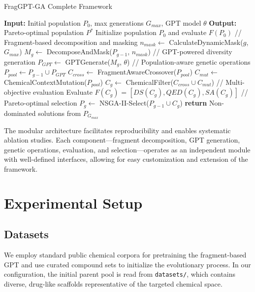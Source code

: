 \documentclass[lettersize,journal]{IEEEtran}
\begin{document}
\begin{algorithm}[!t]
\caption{FragGPT-GA Complete Framework}
\label{alg:frag-gpt-ga}
\begin{algorithmic}
\STATE \textbf{Input:} Initial population $P_0$, max generations $G_{max}$, GPT model $\theta$
\STATE \textbf{Output:} Pareto-optimal population $P^*$
\STATE Initialize population $P_0$ and evaluate $F(P_0)$
    \STATE // Fragment-based decomposition and masking
    \STATE $n_{mask} \leftarrow$ CalculateDynamicMask($g$, $G_{max}$)
    \STATE $M_g \leftarrow$ DecomposeAndMask($P_{g-1}$, $n_{mask}$)
    \STATE // GPT-powered diversity generation
    \STATE $P_{GPT} \leftarrow$ GPTGenerate($M_g$, $\theta$)
    \STATE // Population-aware genetic operations
    \STATE $P_{pool} \leftarrow P_{g-1} \cup P_{GPT}$
    \STATE $C_{cross} \leftarrow$ FragmentAwareCrossover($P_{pool}$)
    \STATE $C_{mut} \leftarrow$ ChemicalContextMutation($P_{pool}$)
    \STATE $C_g \leftarrow$ ChemicalFilter($C_{cross} \cup C_{mut}$)
    \STATE // Multi-objective evaluation
    \STATE Evaluate $F(C_g)$ = $[DS(C_g), QED(C_g), SA(C_g)]$
    \STATE // Pareto-optimal selection
    \STATE $P_g \leftarrow$ NSGA-II-Select($P_{g-1} \cup C_g$)
\ENDFOR
\STATE \textbf{return} Non-dominated solutions from $P_{G_{max}}$
\end{algorithmic}
\end{algorithm}

The modular architecture facilitates reproducibility and enables systematic ablation studies. Each component—fragment decomposition, GPT generation, genetic operations, evaluation, and selection—operates as an independent module with well-defined interfaces, allowing for easy customization and extension of the framework.


\section{Experimental Setup}
\subsection{Datasets}
We employ standard public chemical corpora for pretraining the fragment-based GPT and use curated compound sets to initialize the evolutionary process. In our configuration, the initial parent pool is read from \texttt{datasets/}, which contains diverse, drug-like scaffolds representative of the targeted chemical space.
\end{document}
